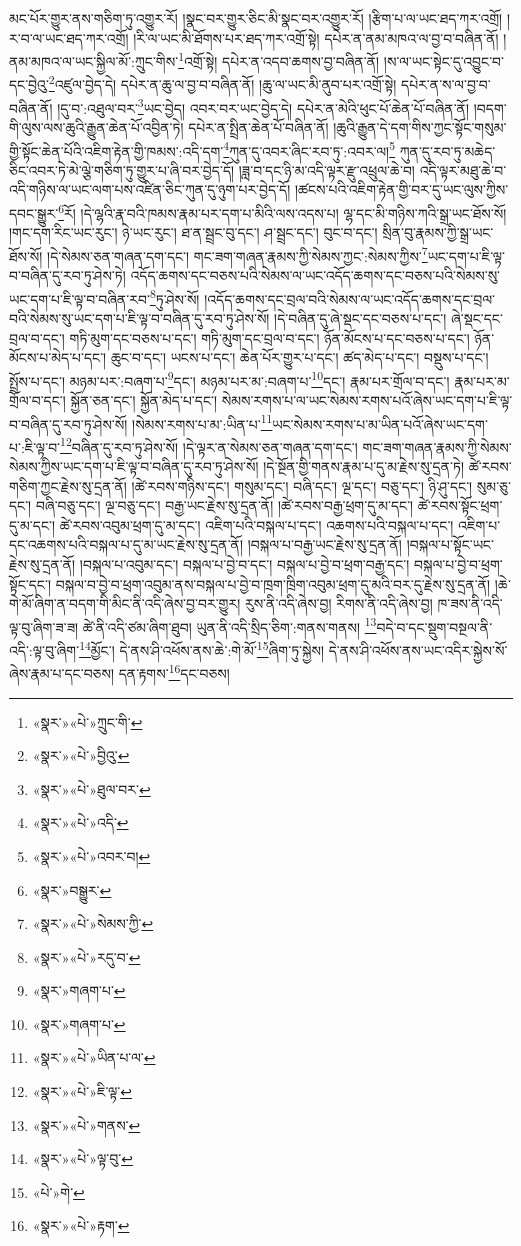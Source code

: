 མང་པོར་གྱུར་ནས་གཅིག་ཏུ་འགྱུར་རོ། །སྣང་བར་གྱུར་ཅིང་མི་སྣང་བར་འགྱུར་རོ། །རྩིག་པ་ལ་ཡང་ཐད་ཀར་འགྲོ། །ར་བ་ལ་ཡང་ཐད་ཀར་འགྲོ། །རི་ལ་ཡང་མི་ཐོགས་པར་ཐད་ཀར་འགྲོ་སྟེ། དཔེར་ན་ནམ་མཁའ་ལ་བྱ་བ་བཞིན་ནོ། །ནམ་མཁའ་ལ་ཡང་སྐྱིལ་མོ་:ཀྲུང་གིས་\footnote{«སྣར་»«པེ་»ཀྲུང་གི་}འགྲོ་སྟེ། དཔེར་ན་འདབ་ཆགས་བྱ་བཞིན་ནོ། །ས་ལ་ཡང་སྟེང་དུ་འབྱུང་བ་དང་བྱེའུ་\footnote{«སྣར་»«པེ་»བྱིའུ་}འཛུལ་བྱེད་དེ། དཔེར་ན་ཆུ་ལ་བྱ་བ་བཞིན་ནོ། །ཆུ་ལ་ཡང་མི་ནུབ་པར་འགྲོ་སྟེ། དཔེར་ན་ས་ལ་བྱ་བ་བཞིན་ནོ། །དུ་བ་:འཐུལ་བར་\footnote{«སྣར་»«པེ་»ཐུལ་བར་}ཡང་བྱེད། འབར་བར་ཡང་བྱེད་དེ། དཔེར་ན་མེའི་ཕུང་པོ་ཆེན་པོ་བཞིན་ནོ། །བདག་གི་ལུས་ལས་ཆུའི་རྒྱུན་ཆེན་པོ་འབྱིན་ཏེ། དཔེར་ན་སྤྲིན་ཆེན་པོ་བཞིན་ནོ། །ཆུའི་རྒྱུན་དེ་དག་གིས་ཀྱང་སྟོང་གསུམ་གྱི་སྟོང་ཆེན་པོའི་འཇིག་རྟེན་གྱི་ཁམས་:འདི་དག་\footnote{«སྣར་»«པེ་»འདི་}ཀུན་དུ་འབར་ཞིང་རབ་ཏུ་:འབར་ལ།\footnote{«སྣར་»«པེ་»འབར་བ།} ཀུན་དུ་རབ་ཏུ་མཆེད་ཅིང་འབར་ཏེ་མེ་ལྕེ་གཅིག་ཏུ་གྱུར་པ་ཞི་བར་བྱེད་དོ། །ཟླ་བ་དང་ཉི་མ་འདི་ལྟར་རྫུ་འཕྲུལ་ཆེ་བ། འདི་ལྟར་མཐུ་ཆེ་བ་འདི་གཉིས་ལ་ཡང་ལག་པས་འཛིན་ཅིང་ཀུན་དུ་ཉུག་པར་བྱེད་དོ། །ཚངས་པའི་འཇིག་རྟེན་གྱི་བར་དུ་ཡང་ལུས་ཀྱིས་དབང་སྒྱུར་\footnote{«སྣར་»བསྒྱུར་}རོ། །དེ་ལྷའི་རྣ་བའི་ཁམས་རྣམ་པར་དག་པ་མིའི་ལས་འདས་པ། ལྷ་དང་མི་གཉིས་ཀའི་སྒྲ་ཡང་ཐོས་སོ། །གང་དག་རིང་ཡང་རུང་། ཉེ་ཡང་རུང་། ཐ་ན་སྦྲང་བུ་དང་། ཤ་སྦྲང་དང་། བུང་བ་དང་། སྲིན་བུ་རྣམས་ཀྱི་སྒྲ་ཡང་ཐོས་སོ། །དེ་སེམས་ཅན་གཞན་དག་དང་། གང་ཟག་གཞན་རྣམས་ཀྱི་སེམས་ཀྱང་:སེམས་ཀྱིས་\footnote{«སྣར་»«པེ་»སེམས་ཀྱི་}ཡང་དག་པ་ཇི་ལྟ་བ་བཞིན་དུ་རབ་ཏུ་ཤེས་ཏེ། འདོད་ཆགས་དང་བཅས་པའི་སེམས་ལ་ཡང་འདོད་ཆགས་དང་བཅས་པའི་སེམས་སུ་ཡང་དག་པ་ཇི་ལྟ་བ་བཞིན་རབ་\footnote{«སྣར་»«པེ་»རདུ་བ་}ཏུ་ཤེས་སོ། །འདོད་ཆགས་དང་བྲལ་བའི་སེམས་ལ་ཡང་འདོད་ཆགས་དང་བྲལ་བའི་སེམས་སུ་ཡང་དག་པ་ཇི་ལྟ་བ་བཞིན་དུ་རབ་ཏུ་ཤེས་སོ། །དེ་བཞིན་དུ་ཞེ་སྡང་དང་བཅས་པ་དང་། ཞེ་སྡང་དང་བྲལ་བ་དང་། གཏི་མུག་དང་བཅས་པ་དང་། གཏི་མུག་དང་བྲལ་བ་དང་། ཉོན་མོངས་པ་དང་བཅས་པ་དང་། ཉོན་མོངས་པ་མེད་པ་དང་། ཆུང་བ་དང་། ཡངས་པ་དང་། ཆེན་པོར་གྱུར་པ་དང་། ཚད་མེད་པ་དང་། བསྡུས་པ་དང་། སྤྲོས་པ་དང་། མཉམ་པར་:བཞག་པ་\footnote{«སྣར་»གཞག་པ་}དང་། མཉམ་པར་མ་:བཞག་པ་\footnote{«སྣར་»གཞག་པ་}དང་། རྣམ་པར་གྲོལ་བ་དང་། རྣམ་པར་མ་གྲོལ་བ་དང་། སྐྱོན་ཅན་དང་། སྐྱོན་མེད་པ་དང་། སེམས་རགས་པ་ལ་ཡང་སེམས་རགས་པའོ་ཞེས་ཡང་དག་པ་ཇི་ལྟ་བ་བཞིན་དུ་རབ་ཏུ་ཤེས་སོ། །སེམས་རགས་པ་མ་:ཡིན་པ་\footnote{«སྣར་»«པེ་»ཡིན་པ་ལ་}ཡང་སེམས་རགས་པ་མ་ཡིན་པའོ་ཞེས་ཡང་དག་པ་:ཇི་ལྟ་བ་\footnote{«སྣར་»«པེ་»ཇི་ལྟ་}བཞིན་དུ་རབ་ཏུ་ཤེས་སོ། །དེ་ལྟར་ན་སེམས་ཅན་གཞན་དག་དང་། གང་ཟག་གཞན་རྣམས་ཀྱི་སེམས་སེམས་ཀྱིས་ཡང་དག་པ་ཇི་ལྟ་བ་བཞིན་དུ་རབ་ཏུ་ཤེས་སོ། །དེ་སྔོན་གྱི་གནས་རྣམ་པ་དུ་མ་རྗེས་སུ་དྲན་ཏེ། ཚེ་རབས་གཅིག་ཀྱང་རྗེས་སུ་དྲན་ནོ། །ཚེ་རབས་གཉིས་དང་། གསུམ་དང་། བཞི་དང་། ལྔ་དང་། བཅུ་དང་། ཉི་ཤུ་དང་། སུམ་ཅུ་དང་། བཞི་བཅུ་དང་། ལྔ་བཅུ་དང་། བརྒྱ་ཡང་རྗེས་སུ་དྲན་ནོ། །ཚེ་རབས་བརྒྱ་ཕྲག་དུ་མ་དང་། ཚེ་རབས་སྟོང་ཕྲག་དུ་མ་དང་། ཚེ་རབས་འབུམ་ཕྲག་དུ་མ་དང་། འཇིག་པའི་བསྐལ་པ་དང་། འཆགས་པའི་བསྐལ་པ་དང་། འཇིག་པ་དང་འཆགས་པའི་བསྐལ་པ་དུ་མ་ཡང་རྗེས་སུ་དྲན་ནོ། །བསྐལ་པ་བརྒྱ་ཡང་རྗེས་སུ་དྲན་ནོ། །བསྐལ་པ་སྟོང་ཡང་རྗེས་སུ་དྲན་ནོ། །བསྐལ་པ་འབུམ་དང་། བསྐལ་པ་བྱེ་བ་དང་། བསྐལ་པ་བྱེ་བ་ཕྲག་བརྒྱ་དང་། བསྐལ་པ་བྱེ་བ་ཕྲག་སྟོང་དང་། བསྐལ་བ་བྱེ་བ་ཕྲག་འབུམ་ནས་བསྐལ་པ་བྱེ་བ་ཁྲག་ཁྲིག་འབུམ་ཕྲག་དུ་མའི་བར་དུ་རྗེས་སུ་དྲན་ནོ། །ཆེ་གེ་མོ་ཞིག་ན་བདག་གི་མིང་ནི་འདི་ཞེས་བྱ་བར་གྱུར། རུས་ནི་འདི་ཞེས་བྱ། རིགས་ནི་འདི་ཞེས་བྱ། ཁ་ཟས་ནི་འདི་ལྟ་བུ་ཞིག་ཟ་ཟ། ཚེ་ནི་འདི་ཙམ་ཞིག་ཐུབ། ཡུན་ནི་འདི་སྲིད་ཅིག་:གནས་གནས། \footnote{«སྣར་»«པེ་»གནས་}བདེ་བ་དང་སྡུག་བསྔལ་ནི་འདི་:ལྟ་བུ་ཞིག་\footnote{«སྣར་»«པེ་»ལྟ་བུ་}མྱོང་། དེ་ནས་ཤི་འཕོས་ནས་ཆེ་:གེ་མོ་\footnote{«པེ་»གེ་}ཞིག་ཏུ་སྐྱེས། དེ་ནས་ཤི་འཕོས་ནས་ཡང་འདིར་སྐྱེས་སོ་ཞེས་རྣམ་པ་དང་བཅས། དན་རྟགས་\footnote{«སྣར་»«པེ་»རྟག་}དང་བཅས། 